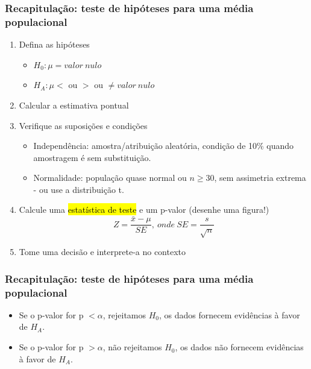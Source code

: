 \begin{frame}
\frametitle{Recapitulação: teste de hipóteses para uma média populacional}

\begin{enumerate}
\justifying
\item Defina as hipóteses
\begin{itemize}
\item $H_0: \mu = valor~nulo$
\item $H_A: \mu <$ ou $>$ ou $\ne valor~nulo$
\end{itemize}
\justifying
\item Calcular a estimativa pontual
\justifying
\item Verifique as suposições e condições
\begin{itemize}
\justifying
\item Independência: amostra/atribuição aleatória, condição de 10\% quando amostragem é sem substituição.
\justifying
\item Normalidade: população quase normal ou $n \ge 30$, sem assimetria extrema - ou use a distribuição t.
\end{itemize}
\justifying
\item Calcule uma \hl{estatística de teste} e um p-valor (desenhe uma figura!)
\[ Z = \frac{\bar{x} - \mu}{SE},~onde~SE = \frac{s}{\sqrt{n}} \]
\justifying
\item Tome uma decisão e interprete-a no contexto
\end{enumerate}

\end{frame}
\begin{frame}
\frametitle{Recapitulação: teste de hipóteses para uma média populacional}

\begin{itemize}
\justifying
\item Se o p-valor for p $<\alpha$, rejeitamos $H_0$, os dados fornecem evidências à favor de $H_A$.
\justifying
\item Se o p-valor for p $>\alpha$, não rejeitamos $H_0$, os dados não fornecem evidências à favor de $H_A$.
\end{itemize}



\end{frame}




